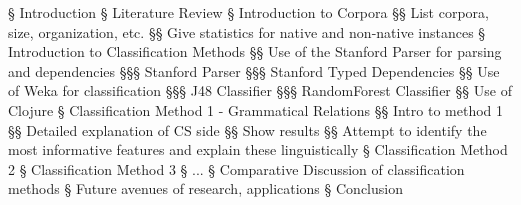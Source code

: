 \documentclass[12pt]{article}
\begin{document}
\begin{easylist}
§ Introduction
§ Literature Review
§ Introduction to Corpora
§§ List corpora, size, organization, etc.
§§ Give statistics for native and non-native instances
§ Introduction to Classification Methods
§§ Use of the Stanford Parser for parsing and dependencies
§§§ Stanford Parser
§§§ Stanford Typed Dependencies
§§ Use of Weka for classification
§§§ J48 Classifier
§§§ RandomForest Classifier
§§ Use of Clojure
§ Classification Method 1 - Grammatical Relations
§§ Intro to method 1
§§ Detailed explanation of CS side
§§ Show results
§§ Attempt to identify the most informative features and explain these linguistically
§ Classification Method 2
§ Classification Method 3
§ ...
§ Comparative Discussion of classification methods
§ Future avenues of research, applications
§ Conclusion
\end{easylist}
\end{document}

